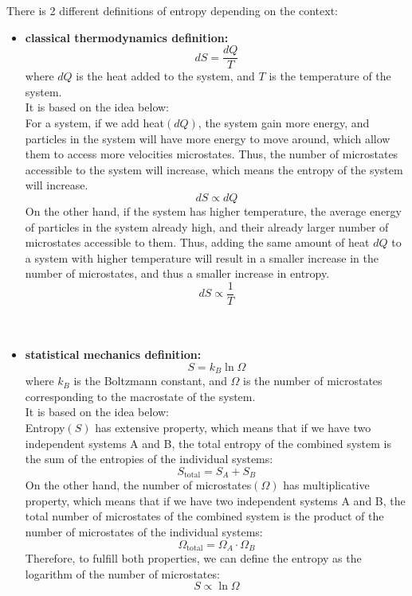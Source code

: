 \clearpage
\begin{foundation}
    There is 2 different definitions of entropy depending on the context:
    \begin{itemize}
        \item \textbf{classical thermodynamics definition:} 
        \[
            dS = \frac{dQ}{T}
        \]
        where $dQ$ is the heat added to the system, and $T$ is the temperature of the system. \\

        It is based on the idea below: \\
        For a system, if we add heat$(dQ)$, the system gain more energy, and particles in the system will have more energy to move around, which allow them to access more velocities microstates. Thus, the number of microstates accessible to the system will increase, which means the entropy of the system will increase. \\
        \[
            dS \propto dQ
        \]
        On the other hand, if the system has higher temperature, the average energy of particles in the system already high, and their already larger number of microstates accessible to them. Thus, adding the same amount of heat $dQ$ to a system with higher temperature will result in a smaller increase in the number of microstates, and thus a smaller increase in entropy. \\
        \[
            dS \propto \frac{1}{T}
        \]
        \\
        \\
        \item \textbf{statistical mechanics definition:}
        \[
            S = k_B \ln \Omega
        \]
        where $k_B$ is the Boltzmann constant, and $\Omega$ is the number of microstates corresponding to the macrostate of the system. \\

        It is based on the idea below: \\
        Entropy$(S)$ has extensive property, which means that if we have two independent systems A and B, the total entropy of the combined system is the sum of the entropies of the individual systems:
        \[
            S_{\text{total}} = S_A + S_B
        \]
        On the other hand, the number of microstates$(\Omega)$ has multiplicative property, which means that if we have two independent systems A and B, the total number of microstates of the combined system is the product of the number of microstates of the individual systems:
        \[
            \Omega_{\text{total}} = \Omega_A \cdot \Omega_B
        \]
         Therefore, to fulfill both properties, we can define the entropy as the logarithm of the number of microstates:
        \[
            S \propto \ln \Omega
        \]
    \end{itemize}
\end{foundation}

